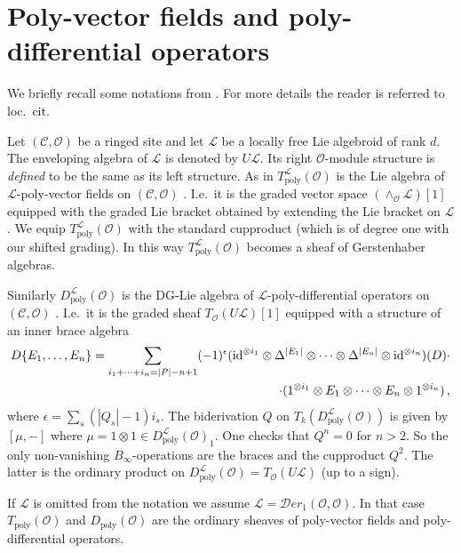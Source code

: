 \documentclass{amsart}
\numberwithin{equation}{section}
\let\cal\mathcal
\theoremstyle{definition}
\theoremstyle{remark}
\begin{document}
\section{Poly-vector fields and poly-differential operators}
\label{ref-8-30}

We briefly recall some notations from \cite{vdbcalaque}. For more details
the reader is referred to loc.\ cit.

Let $({{\cal C}},{{\cal O}})$ be a ringed site and let ${{\cal L}}$ be a locally free
Lie algebroid of rank $d$. The enveloping algebra of
${{\cal L}}$ is denoted by $U{{\cal L}}$.  Its right ${{\cal O}}$-module structure is
\emph{defined} to be the same as its left structure.  As in
\cite{vdbcalaque} $T_{\operatorname{poly}}^{{\cal L}}({{\cal O}})$ is the Lie algebra of
${{\cal L}}$-poly-vector fields on $({{\cal C}},{{\cal O}})$ \cite{cal}. I.e.\ it is
the graded vector space $(\wedge_{{\cal O}} {{\cal L}})[1]$ equipped with the
graded Lie bracket obtained by extending the Lie bracket on ${{\cal L}}$.
We equip $T_{\operatorname{poly}}^{{\cal L}}({{\cal O}})$ with the standard cupproduct
(which is of degree one with our shifted grading).  In this way
$T_{\operatorname{poly}}^{{\cal L}}({{\cal O}})$ becomes a sheaf of Gerstenhaber algebras.

Similarly $D_{\operatorname{poly}}^{{\cal L}}({{\cal O}})$ is the DG-Lie algebra of
${{\cal L}}$-poly-differential operators on $({{\cal C}},{{\cal O}})$ \cite{cal}.
I.e.\ it is the graded sheaf $T_{{\cal O}}(U{{\cal L}})[1]$ equipped with a
structure of an inner brace algebra
\begin{align*}
D\{E_1,\ldots,E_n\}=\sum_{i_1+\cdots+i_n=|P|-n+1}
(-1)^\epsilon 
({\rm id}^{\otimes i_1}\otimes\Delta^{|E_1|}\otimes\cdots\otimes\Delta^{|E_n|}\otimes{\rm id}^{\otimes i_n})(D)\cdot\\
\cdot(1^{\otimes i_1}\otimes E_1\otimes\cdots\otimes E_n\otimes1^{\otimes i_n})\,,
\end{align*}
where $\epsilon=\sum_s(|Q_s|-1)i_s$. The biderivation $Q$ on
$T_k(D_{\operatorname{poly}}^{{\cal L}}({{\cal O}}))$ is given by $[\mu,-]$ where
$\mu=1\otimes 1\in D_{\operatorname{poly}}^{{\cal L}}({{\cal O}})_1$. One checks that
$Q^n=0$ for $n>2$. So the only non-vanishing $B_\infty$-operations are
the braces and the cupproduct $Q^2$.  The latter is the ordinary product on
$D_{\operatorname{poly}}^{{\cal L}}({{\cal O}})=T_{{\cal O}}(U{{\cal L}})$ (up to a sign).

If ${{\cal L}}$ is omitted from the notation we assume
${{\cal L}}={{\cal D}}\mathit{er}_1({{\cal O}},{{\cal O}})$. In that case
$T_{\operatorname{poly}}({{\cal O}})$ and $D_{\operatorname{poly}}({{\cal O}})$ are the ordinary sheaves of
poly-vector fields and poly-differential operators. 
\end{document}
